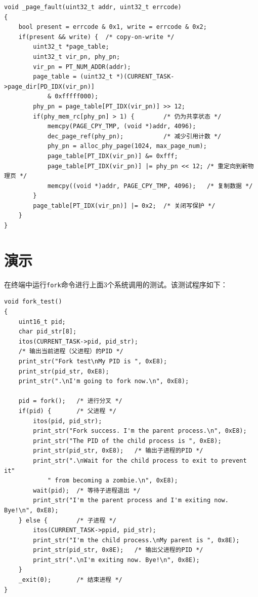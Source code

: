 \documentclass[a4paper, adobefonts]{ctexart}
\begin{document}
\begin{verbatim}
void _page_fault(uint32_t addr, uint32_t errcode)
{
    bool present = errcode & 0x1, write = errcode & 0x2;
    if(present && write) {  /* copy-on-write */
        uint32_t *page_table;
        uint32_t vir_pn, phy_pn;
        vir_pn = PT_NUM_ADDR(addr);
        page_table = (uint32_t *)(CURRENT_TASK->page_dir[PD_IDX(vir_pn)]
            & 0xfffff000);
        phy_pn = page_table[PT_IDX(vir_pn)] >> 12;
        if(phy_mem_rc[phy_pn] > 1) {        /* 仍为共享状态 */
            memcpy(PAGE_CPY_TMP, (void *)addr, 4096);
            dec_page_ref(phy_pn);           /* 减少引用计数 */
            phy_pn = alloc_phy_page(1024, max_page_num);
            page_table[PT_IDX(vir_pn)] &= 0xfff;
            page_table[PT_IDX(vir_pn)] |= phy_pn << 12; /* 重定向到新物理页 */
            memcpy((void *)addr, PAGE_CPY_TMP, 4096);   /* 复制数据 */
        }
        page_table[PT_IDX(vir_pn)] |= 0x2;  /* 关闭写保护 */
    }
}
\end{verbatim}

\section{演示}

在终端中运行\verb|fork|命令进行上面3个系统调用的测试。该测试程序如下：

\begin{verbatim}
void fork_test()
{
    uint16_t pid;
    char pid_str[8];
    itos(CURRENT_TASK->pid, pid_str);
    /* 输出当前进程（父进程）的PID */
    print_str("Fork test\nMy PID is ", 0xE8);
    print_str(pid_str, 0xE8);
    print_str(".\nI'm going to fork now.\n", 0xE8);

    pid = fork();   /* 进行分叉 */
    if(pid) {       /* 父进程 */
        itos(pid, pid_str);
        print_str("Fork success. I'm the parent process.\n", 0xE8);
        print_str("The PID of the child process is ", 0xE8);
        print_str(pid_str, 0xE8);   /* 输出子进程的PID */
        print_str(".\nWait for the child process to exit to prevent it"
            " from becoming a zombie.\n", 0xE8);
        wait(pid);  /* 等待子进程退出 */
        print_str("I'm the parent process and I'm exiting now. Bye!\n", 0xE8);
    } else {        /* 子进程 */
        itos(CURRENT_TASK->ppid, pid_str);
        print_str("I'm the child process.\nMy parent is ", 0x8E);
        print_str(pid_str, 0x8E);   /* 输出父进程的PID */
        print_str(".\nI'm exiting now. Bye!\n", 0x8E);
    }
    _exit(0);       /* 结束进程 */
}
\end{verbatim}
\end{document}
